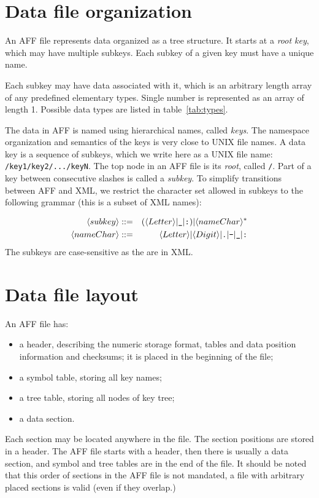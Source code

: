 \documentclass[10pt,letterpaper]{article}
\newcommand{\bi}{\begin{itemize}}
\newcommand{\ei}{\end{itemize}}             %
\newcommand{\term}[1]{\textit{#1}\index{\textit{#1}}}          %
\newcommand{\ctext}[1]{\texttt{#1}}         %
\begin{document}
\section{Data file organization}\label{file-org}
An AFF file represents data organized as a tree structure. 
It starts at a \term{root key}, which may have multiple subkeys. 
Each subkey of a given key must have a unique name. 

Each subkey may have data associated with it, which is an arbitrary length array of any
predefined elementary types.
Single number is represented as an array of length 1.
Possible data types are listed in table~\ref{tab:types}.

The data in AFF is named using hierarchical names, called
\term{keys}. The namespace organization and semantics of the keys is
very close to UNIX file names. A data key is a sequence of subkeys,
which we write here as a UNIX file name:
\ctext{/key1/key2/.../keyN}. The top node in an AFF file is its
\term{root}, called \ctext{/}. Part of a key between consecutive
slashes is called a \term{subkey}. To simplify transitions between AFF
and XML, we restrict the character set allowed in subkeys to the
following grammar (this is a subset of XML names):

\begin{eqnarray*}
\langle subkey \rangle & ::= & (\langle Letter \rangle | \verb|_| | \verb|:| ) | \langle nameChar \rangle^{*} \\
\langle nameChar \rangle & ::= & \langle Letter \rangle | \langle Digit \rangle | \verb|.| | \verb|-| | \verb|_| | \verb|:|
\end{eqnarray*}
The subkeys are case-sensitive as the are in XML.

\newpage
\section{Data file layout}
An AFF file has:
\bi
\item a header, describing the numeric storage format, tables and data
  position information and checksums; it is placed in the beginning of
  the file;
\item a symbol table, storing all key names;
\item a tree table, storing all nodes of key tree;
\item a data section.
\ei

Each section may be located anywhere in the file.  The section positions
are stored in a header.  The AFF file starts with a header, then there
is usually a data section, and symbol and tree tables are in the end
of the file. It should be noted that this order of sections in the AFF
file is not mandated, a file with arbitrary placed sections is valid
(even if they overlap.)
\end{document}
